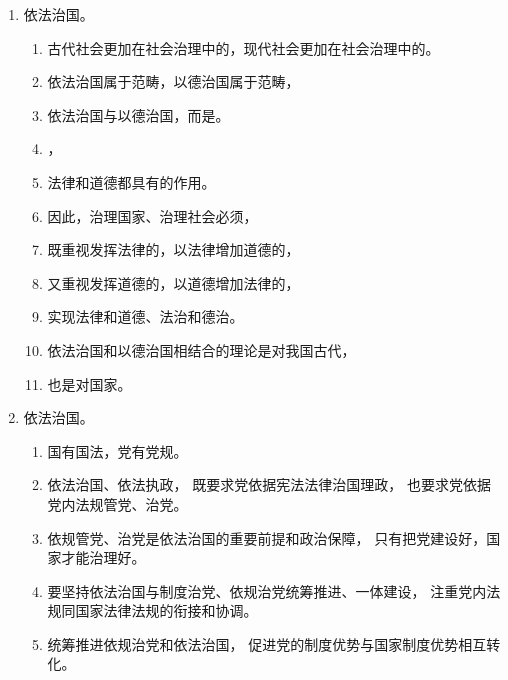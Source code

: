 \begin{enumerate}
\begin{enumerate}
\begin{enumerate}
\begin{enumerate}
                        \end{enumerate}
                \end{enumerate}
          \item 依法治国。
                \begin{enumerate}
                  \item 古代社会更加在社会治理中的，现代社会更加在社会治理中的。
                  \item 依法治国属于范畴，以德治国属于范畴，
                  \item 依法治国与以德治国，而是。
                  \item {}，
                  \item 法律和道德都具有的作用。
                  \item 因此，治理国家、治理社会必须，
                  \item 既重视发挥法律的，以法律增加道德的，
                  \item 又重视发挥道德的，以道德增加法律的，
                  \item 实现法律和道德、法治和德治。
                  \item 依法治国和以德治国相结合的理论是对我国古代，
                  \item 也是对国家。
                \end{enumerate}
          \item 依法治国。
                \begin{enumerate}
                  \item 国有国法，党有党规。
                  \item 依法治国、依法执政，
                        既要求党依据宪法法律治国理政，
                        也要求党依据党内法规管党、治党。
                  \item 依规管党、治党是依法治国的重要前提和政治保障，
                        只有把党建设好，国家才能治理好。
                  \item 要坚持依法治国与制度治党、依规治党统筹推进、一体建设，
                        注重党内法规同国家法律法规的衔接和协调。
                  \item 统筹推进依规治党和依法治国，
                        促进党的制度优势与国家制度优势相互转化。
                \end{enumerate}
        \end{enumerate}
\end{enumerate}